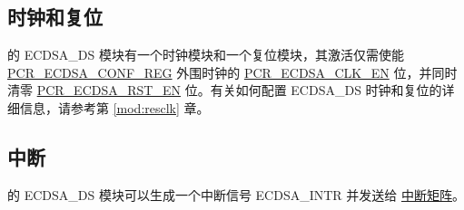 \documentclass[main\_\_CN.tex]{subfiles}
\begin{document}
\subsection{时钟和复位}

\chipname{} 的 ECDSA\_DS 模块有一个时钟模块和一个复位模块，其激活仅需使能 \hyperref[regdesc:PCRECDSACONFREG]{PCR\_ECDSA\_CONF\_REG} 外围时钟的 \hyperref[fielddesc:PCRECDSACLKEN]{PCR\_ECDSA\_CLK\_EN} 位，并同时清零 \hyperref[fielddesc:PCRECDSARSTEN]{PCR\_ECDSA\_RST\_EN} 位。有关如何配置 ECDSA\_DS 时钟和复位的详细信息，请参考第 \ref{mod:resclk} 章\textit{}。

\subsection{中断}
\label{sec:eccda-interrupt}

\chipname{} 的 ECDSA\_DS 模块可以生成一个中断信号 ECDSA\_INTR 并发送给 \hyperref[mod:intmtrx]{中断矩阵}。
\end{document}
